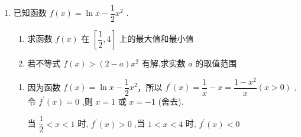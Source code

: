 \begin{enumerate}
\begin{jieda}
        所以MAX $f\left( x\right)  = f\left( \beta \right) ,\operatorname{MIN}f\left( x\right)  = f\left( \alpha \right)$ ,
        于是 $g\left( t\right)  = f\left( \beta \right)  - f\left( \alpha \right)  = \dfrac{{2\beta } - t}{{\beta }^{2} + 1} - \dfrac{{2\alpha } - t}{{\alpha }^{2} + 1} = \dfrac{\left( {\beta  - \alpha }\right) \left\lbrack  {t\left( {\alpha  + \beta }\right)  - {2\alpha \beta } + 2}\right\rbrack  }{{\alpha }^{2}{\beta }^{2} + {\alpha }^{2} + {\beta }^{2} + 1} = \dfrac{\left( {\beta  - \alpha }\right) \left\lbrack  {t\left( {\alpha  + \beta }\right)  - {2\alpha \beta } + 2}\right\rbrack  }{{\left( \alpha \beta \right) }^{2} + {\left( \alpha  + \beta \right) }^{2} - {2\alpha \beta } + 1},$
        因为 $\alpha  + \beta  = t,{\alpha \beta } =  - \dfrac{1}{4},\beta  > \alpha$ ,
        所以 $\beta  - \alpha  = \sqrt{{\left( \alpha  + \beta \right) }^{2} - {4\alpha \beta }} = \sqrt{{t}^{2} + 1}$ ,
        将 $\alpha  + \beta  = t,{\alpha \beta } =  - \dfrac{1}{4},\beta  - \alpha  = \sqrt{{t}^{2} + 1}$ 代入 $g\left( t\right)  = \dfrac{\left( {\beta  - \alpha }\right) \left\lbrack  {t\left( {\alpha  + \beta }\right)  - {2\alpha \beta } + 2}\right\rbrack  }{{\left( \alpha \beta \right) }^{2} + {\left( \alpha  + \beta \right) }^{2} - {2\alpha \beta } + 1}$ ,
        得 $g\left( t\right)  = \dfrac{\sqrt{{t}^{2} + 1}\left( {{t}^{2} + \dfrac{5}{2}}\right) }{{t}^{2} + \dfrac{25}{16}} = \dfrac{8\sqrt{{t}^{2} + 1}\left( {2{t}^{2} + 5}\right) }{{16}{t}^{2} + {25}}$ .
    \end{jieda}

    \item 已知函数 $f\left( x\right)  = \ln x - \dfrac{1}{2}{x}^{2}$ . 
    \begin{enumerate}
        \item 求函数 $f\left( x\right)$ 在 $\left\lbrack  {\dfrac{1}{2},4}\right\rbrack$ 上的最大值和最小值
        \item 若不等式 $f\left( x\right)  > \left( {2 - a}\right) {x}^{2}$ 有解,求实数 $a$ 的取值范围
    \end{enumerate}
    \begin{jieda}
        \begin{enumerate}
            \item 因为函数 $f\left( x\right)  = \ln x - \dfrac{1}{2}{x}^{2}$，所以 ${f}^{\prime }\left( x\right)  = \dfrac{1}{x} - x = \dfrac{1 - {x}^{2}}{x}\left( {x > 0}\right)$ .令 ${f}^{\prime }\left( x\right)  = 0$ ,则 $x = 1$ 或 $x =  - 1$ (舍去).
            
            当 $\dfrac{1}{2} < x < 1$ 时, ${f}^{\prime }\left( x\right)  > 0$ ,当 $1 < x < 4$ 时, ${f}^{\prime }\left( x\right)  < 0$
            

\end{enumerate}
\end{jieda}
\end{enumerate}

